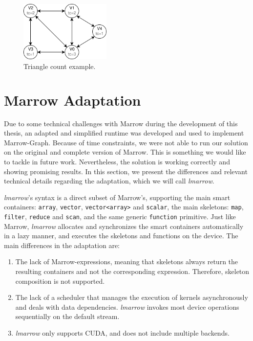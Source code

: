 \begin{figure}
  \centering
    \includegraphics[width=0.4\textwidth]{Chapters/Figures/Images/triangle_count.png}
    \caption{Triangle count example.}
\label{fig:trig_count_example}
\end{figure}





\section{Marrow Adaptation}

Due to some technical challenges with Marrow during the development of this thesis, an adapted and simplified runtime was developed and used to implement Marrow-Graph. Because of time constraints, we were not able to run our solution on the original and complete version of Marrow. This is something we would like to tackle in future work. Nevertheless, the solution is working correctly and showing promising results. In this section, we present the differences and relevant technical details regarding the adaptation, which we will call \textit{lmarrow}.

\textit{lmarrow}'s syntax is a direct subset of Marrow's, supporting the main smart containers: \texttt{array}, \texttt{vector}, \texttt{vector<array>} and \texttt{scalar}, the main skeletons: \texttt{map}, \texttt{filter}, \texttt{reduce} and \texttt{scan}, and the same generic \texttt{function} primitive. Just like Marrow, \textit{lmarrow} allocates and synchronizes the smart containers automatically in a lazy manner, and executes the skeletons and functions on the device.
%
The main differences in the adaptation are:
\begin{enumerate}
    \item The lack of Marrow-expressions, meaning that skeletons always return the resulting containers and not the corresponding expression. Therefore, skeleton composition is not supported.
    \item The lack of a scheduler that manages the execution of kernels asynchronously and deals with data dependencies. \textit{lmarrow} invokes most device operations sequentially on the default stream.
    \item \textit{lmarrow} only supports CUDA, and does not include multiple backends.
\end{enumerate}


